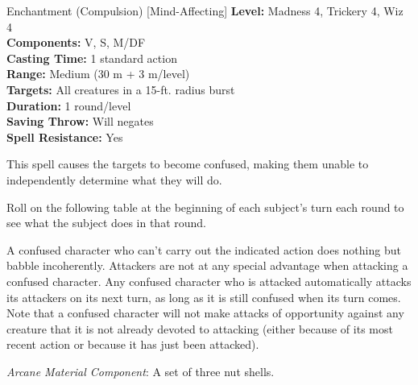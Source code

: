 {Enchantment (Compulsion) [Mind-Affecting]}
{
	\textbf{Level:}
	Madness 4, Trickery 4, Wiz 4\\
	\textbf{Components:}
	V, S, M/DF\\
	\textbf{Casting Time:}
	1 standard action\\
	\textbf{Range:}
	Medium (30 m + 3 m/level)\\
	\textbf{Targets:}
	All creatures in a 15-ft. radius burst\\
	\textbf{Duration:}
	1 round/level\\
	\textbf{Saving Throw:}
	Will negates\\
	\textbf{Spell Resistance:}
	Yes\\
}
{
	This spell causes the targets to become confused, making them unable to independently determine what they will do.

	Roll on the following table at the beginning of each subject's turn each round to see what the subject does in that round.


	A confused character who can't carry out the indicated action does nothing but babble incoherently. Attackers are not at any special advantage when attacking a confused character. Any confused character who is attacked automatically attacks its attackers on its next turn, as long as it is still confused when its turn comes. Note that a confused character will not make attacks of opportunity against any creature that it is not already devoted to attacking (either because of its most recent action or because it has just been attacked).

	\textit{Arcane Material Component}:
	A set of three nut shells.

}
